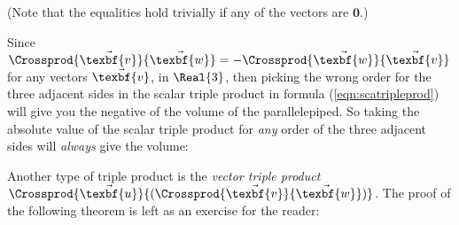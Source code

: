 
\par\noindent(Note that the equalities hold trivially if any of the vectors are $\textbf{0}$.)\vspace{2mm}

Since $\Crossprod{\vec{\texbf{v}}}{\vec{\texbf{w}}} = -\Crossprod{\vec{\texbf{w}}}{\vec{\texbf{v}}}$ for any vectors $\vec{\texbf{v}}$, 
in $\Real{3}$, then picking the wrong order for the three adjacent sides in the scalar triple product in formula
(\ref{eqn:scatripleprod}) will give you the negative of the volume of the parallelepiped. So
taking the absolute value of the scalar triple product for \emph{any} order of the three adjacent sides will
\emph{always} give the volume:


Another type of triple product is the \emph{vector triple product}
$\Crossprod{\vec{\texbf{u}}}{(\Crossprod{\vec{\texbf{v}}}{\vec{\texbf{w}}})}$. The proof of the following theorem is left as an
exercise for the reader:


